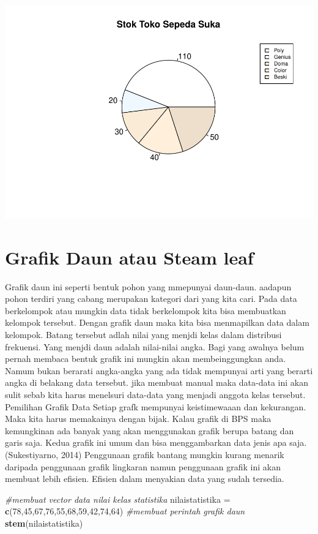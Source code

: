 \documentclass[
]{book}
\newenvironment{Shaded}{\begin{snugshade}}{\end{snugshade}}
\newcommand{\CommentTok}[1]{\textcolor[rgb]{0.56,0.35,0.01}{\textit{#1}}}
\newcommand{\DecValTok}[1]{\textcolor[rgb]{0.00,0.00,0.81}{#1}}
\newcommand{\FunctionTok}[1]{\textcolor[rgb]{0.13,0.29,0.53}{\textbf{#1}}}
\newcommand{\NormalTok}[1]{#1}
\newcommand{\OtherTok}[1]{\textcolor[rgb]{0.56,0.35,0.01}{#1}}
\theoremstyle{definition}
\theoremstyle{definition}
\theoremstyle{definition}
\theoremstyle{definition}
\theoremstyle{remark}
\begin{document}
\includegraphics{_main_files/figure-latex/unnamed-chunk-13-2.pdf}

\hypertarget{grafik-daun-atau-steam-leaf}{%
\section{Grafik Daun atau Steam leaf}\label{grafik-daun-atau-steam-leaf}}

Grafik daun ini seperti bentuk pohon yang mmepunyai daun-daun. aadapun pohon terdiri yang cabang merupakan kategori dari yang kita cari. Pada data berkelompok atau mungkin data tidak berkelompok kita bisa membuatkan kelompok tersebut. Dengan grafik daun maka kita bisa menmapilkan data dalam kelompok. Batang tersebut adlah nilai yang menjdi kelas dalam distribusi frekuensi.
Yang menjdi daun adalah nilai-nilai angka. Bagi yang awalnya belum pernah membaca bentuk grafik ini mungkin akan membeinggungkan anda. Namum bukan berarati angka-angka yang ada tidak mempunyai arti yang berarti angka di belakang data tersebut.
jika membuat manual maka data-data ini akan sulit sebab kita harus menelsuri data-data yang menjadi anggota kelas tersebut.
Pemilihan Grafik Data
Setiap grafk mempunyai keistimewaaan dan kekurangan. Maka kita harus memakainya dengan bijak. Kalau grafik di BPS maka kemungkinan ada banyak yang akan menggunakan grafik berupa batang dan garis saja. Kedua grafik ini umum dan bisa menggambarkan data jenis apa saja. (Sukestiyarno, 2014)
Penggunaan grafik bantang mungkin kurang menarik daripada penggunaan grafik lingkaran namun penggunaan grafik ini akan membuat lebih efisien. Efisien dalam menyakian data yang sudah tersedia.

\begin{Shaded}
\begin{Highlighting}[]
\CommentTok{\#membuat vector data nilai kelas statistika}
\NormalTok{nilaistatistika }\OtherTok{=} \FunctionTok{c}\NormalTok{(}\DecValTok{78}\NormalTok{,}\DecValTok{45}\NormalTok{,}\DecValTok{67}\NormalTok{,}\DecValTok{76}\NormalTok{,}\DecValTok{55}\NormalTok{,}\DecValTok{68}\NormalTok{,}\DecValTok{59}\NormalTok{,}\DecValTok{42}\NormalTok{,}\DecValTok{74}\NormalTok{,}\DecValTok{64}\NormalTok{)}
\CommentTok{\#membuat perintah grafik daun }
\FunctionTok{stem}\NormalTok{(nilaistatistika)}
\end{Highlighting}
\end{Shaded}
\end{document}
